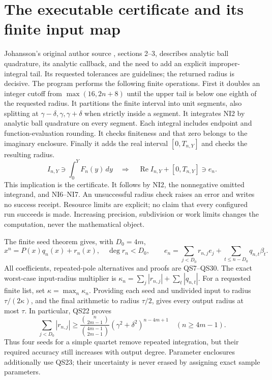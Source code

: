 \documentclass[11pt]{article}
\begin{document}
\section{The executable certificate and its finite input map}
Johansson's original author source \cite{Johansson}, sections 2--3,
describes analytic ball quadrature, its analytic callback, and the
need to add an explicit improper-integral tail. Its requested
tolerances are guidelines; the returned radius is decisive.
The program performs the following finite operations.
First it doubles an integer cutoff from
\(\max(16,2n+8)\) until the upper tail is below one eighth of the
requested radius. It partitions the finite interval into unit
segments, also splitting at \(\gamma-\delta,\gamma,\gamma+\delta\)
when strictly inside a segment. It integrates NI2 by analytic ball
quadrature on every segment. Each integral includes endpoint and
function-evaluation rounding. It checks finiteness and that zero
belongs to the imaginary enclosure. Finally it adds the real
interval \([0,T_{n,Y}]\) and checks the resulting radius.
\begin{equation}\tag{NI8}
 I_{n,Y}\ni\int_0^YF_n(y)\,dy
 \quad\Longrightarrow\quad
 \operatorname{Re}I_{n,Y}+[0,T_{n,Y}]\ni e_n .
\end{equation}
This implication is the certificate. It follows by NI2, the
nonnegative omitted integrand, and NI6--NI7. An unsuccessful
radius check raises an error and writes no success receipt.
Resource limits are explicit; no claim that every configured
run succeeds is made. Increasing precision, subdivision or
work limits changes the computation, never the mathematical object.

The finite seed theorem gives, with \(D_0=4m\),
\begin{equation}\tag{NI9}
 x^n=P(x)q_n(x)+r_n(x),\quad \deg r_n<D_0,\qquad
 e_n=\sum_{j<D_0}r_{n,j}e_j+\sum_{t\le n-D_0}q_{n,t}\beta_t.
\end{equation}
All coefficients, repeated-pole alternatives and proofs are QS7--QS30.
The exact worst-case input-radius multiplier is
\(\kappa_n=\sum_j|r_{n,j}|+\sum_t|q_{n,t}|\).
For a requested finite list, set
\(\kappa=\max_n\kappa_n\).
Providing each seed and undivided input to radius
\(\tau/(2\kappa)\), and the final arithmetic to radius
\(\tau/2\), gives every output radius at most \(\tau\).
In particular, QS22 proves
\begin{equation}\tag{NI10}
 \sum_{j<D_0}|r_{n,j}|
 \ge \frac{\binom{n}{2m-1}}{\binom{4m-1}{2m-1}}
       (\gamma^2+\delta^2)^{n-4m+1}\quad(n\ge4m-1).
\end{equation}
Thus four seeds for a simple quartet remove repeated integration,
but their required accuracy still increases with output degree.
Parameter enclosures additionally use QS23; their uncertainty is
never erased by assigning exact sample parameters.
\end{document}
